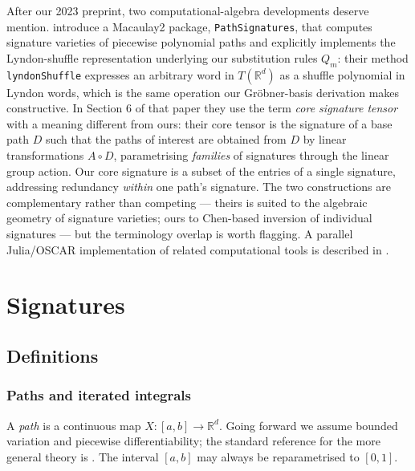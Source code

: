 \documentclass[12pt,english]{article}
\theoremstyle{remark}
\begin{document}
After our 2023 preprint, two computational-algebra developments deserve
mention. \cite{macaulay2} introduce a Macaulay2 package, \texttt{PathSignatures},
that computes signature varieties of piecewise polynomial paths and
explicitly implements the Lyndon-shuffle representation underlying
our substitution rules $Q_{m}$: their method \texttt{lyndonShuffle}
expresses an arbitrary word in $T(\mathbb{R}^{d})$ as a shuffle polynomial
in Lyndon words, which is the same operation our Gröbner-basis derivation
makes constructive. In Section 6 of that paper they use the term \emph{core
signature tensor} with a meaning different from ours: their core tensor
is the signature of a base path $D$ such that the paths of interest
are obtained from $D$ by linear transformations $A\circ D$, parametrising
\emph{families} of signatures through the linear group action. Our
core signature is a subset of the entries of a single signature, addressing
redundancy \emph{within} one path's signature. The two constructions
are complementary rather than competing --- theirs is suited to the
algebraic geometry of signature varieties; ours to Chen-based inversion
of individual signatures --- but the terminology overlap is worth flagging.
A parallel Julia/OSCAR implementation of related computational tools
is described in \cite{signaturetensorsjl}.

\section{Signatures\label{sec:Signatures}}

\subsection{Definitions}

\subsubsection{Paths and iterated integrals}

A \emph{path} is a continuous map $X:[a,b]\to\mathbb{R}^{d}$. Going
forward we assume bounded variation and piecewise differentiability;
the standard reference for the more general theory is \cite{Lyons}.
The interval $[a,b]$ may always be reparametrised to $[0,1]$.
\end{document}
